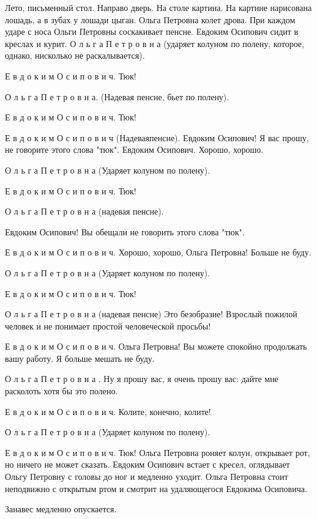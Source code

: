 Лето, письменный стол. Направо дверь. На столе картина. На картине нарисована лошадь, а в зубах у лошади цыган.
Ольга Петровна колет дрова. При каждом ударе с носа Ольги Петровны соскакивает  пенсне. Евдоким Осипович сидит в креслах и курит.
    О л ь г а  П е т р о в н а (ударяет колуном по полену, которое,  однако, нисколько не раскалывается).

    Е в д о к и м  О с и п о в и ч. Тюк!

    О л ь г а  П е т р о в н а. (Надевая пенсне, бьет по полену).
    
    Е в д о к и м  О с и п о в и ч. Тюк!
    
    Е в д о к и м  О с и п о в и ч (Надеваяпенсне). 
Евдоким Осипович!  Я вас прошу,  не говорите этого слова "тюк".
Евдоким Осипович. Хорошо, хорошо.

    О л ь г а  П е т р о в н а (Ударяет колуном по полену).

    Е в д о к и м  О с и п о в и ч. Тюк!

    О л ь г а  П е т р о в н а (надевая пенсне). 

Евдоким Осипович! Вы обещали не говорить этого слова "тюк".

    Е в д о к и м  О с и п о в и ч.  Хорошо,
хорошо, Ольга Петровна! Больше не буду.

    О л ь г а  П е т р о в н а (Ударяет колуном по полену).

    Е в д о к и м  О с и п о в и ч. Тюк!
    
    О л ь г а  П е т р о в н а (надевая пенсне)
Это безобразие! Взрослый пожилой человек
и не  понимает простой человеческой просьбы!

    Е в д о к и м   О с и п о в и ч. 
Ольга Петровна! Вы можете спокойно продолжать вашу
работу. Я больше мешать не буду.

    О л ь г а  П е т р о в н а . Ну  я прошу
вас, я очень прошу вас: дайте  мне расколоть
хотя бы это полено.

    Е в д о к и м  О с и п о в и ч.  Колите,
конечно, колите!

    О л ь г а  П е т р о в н а  (Ударяет колуном по полену).

    Е в д о к и м  О с и п о в и ч. Тюк!
Ольга  Петровна роняет колун,  открывает
рот, но ничего не может сказать. Евдоким
Осипович встает с кресел, оглядывает Ольгу
Петровну с головы до ног и медленно уходит.
Ольга Петровна стоит неподвижно с открытым
ртом и смотрит на удаляющегося Евдокима Осиповича.

\begin{center}
    Занавес медленно опускается.
\end{center}